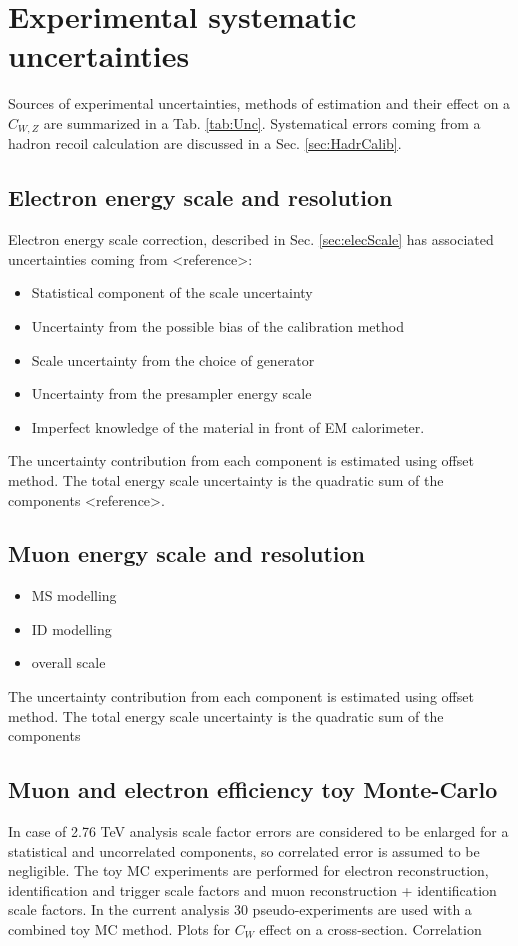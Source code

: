 \section{Experimental systematic uncertainties}
Sources of experimental uncertainties, methods of estimation and their effect on a $C_{W,Z}$ are summarized in a Tab. \ref{tab:Unc}. Systematical errors coming from a hadron recoil calculation are discussed in a Sec. \ref{sec:HadrCalib}. 
\subsection{Electron energy scale and resolution}
Electron energy scale correction, described in Sec. \ref{sec:elecScale} has associated uncertainties coming from <reference>:
\begin{itemize}
\item Statistical component of the scale uncertainty
\item Uncertainty from the possible bias of the calibration method
\item Scale uncertainty from the choice of generator
\item Uncertainty from the presampler energy scale
\item Imperfect knowledge of the material in front of EM calorimeter.
\end{itemize}
The uncertainty contribution from each component is estimated using offset method. The total energy scale uncertainty is the quadratic sum of the components <reference>. 

\subsection{Muon energy scale and resolution}
\begin{itemize}
\item MS modelling
\item ID modelling 
\item overall scale
\end{itemize}
The uncertainty contribution from each component is estimated using offset method. The total energy scale uncertainty is the quadratic sum of the components

\subsection{Muon and electron efficiency toy Monte-Carlo}
 In case of 2.76 TeV analysis scale factor errors are considered to be enlarged for a statistical and uncorrelated components, so correlated error is assumed to be negligible. The toy MC experiments are performed for electron reconstruction, identification and trigger scale factors and muon reconstruction + identification scale factors.  In the current analysis 30 pseudo-experiments are used with a combined toy MC method. 
 Plots for $C_{W}$ effect on a cross-section. 
 Correlation
 
